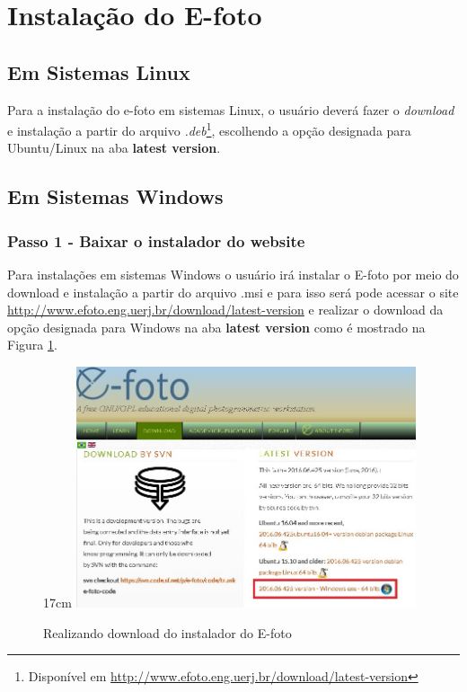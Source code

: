 \section{Instalação do E-foto}
\subsection{Em Sistemas Linux}
Para a instalação do e-foto em sistemas Linux, o usuário deverá fazer o \textit{download} e instalação a partir do arquivo \textit{.deb}\footnote{Disponível em  \url{http://www.efoto.eng.uerj.br/download/latest-version}}, escolhendo a opção designada para Ubuntu/Linux na aba \textbf{latest version}.
\subsection{Em Sistemas Windows}
\subsubsection{Passo 1 - Baixar o instalador do website}
Para instalações em sistemas Windows o usuário irá instalar o E-foto por meio do download e instalação a partir do arquivo .msi e para isso será pode acessar o site \url{http://www.efoto.eng.uerj.br/download/latest-version} e realizar o download da opção designada para Windows na aba \textbf{latest version} como é mostrado na Figura \ref{fig:downmsi}. %
\begin{figure}[!ht]{17cm}
	\centering
	\includegraphics[width=10cm]{Figuras/downmsi.jpg} %
	\caption{Realizando download do instalador do E-foto} \label{fig:downmsi}
\end{figure}


